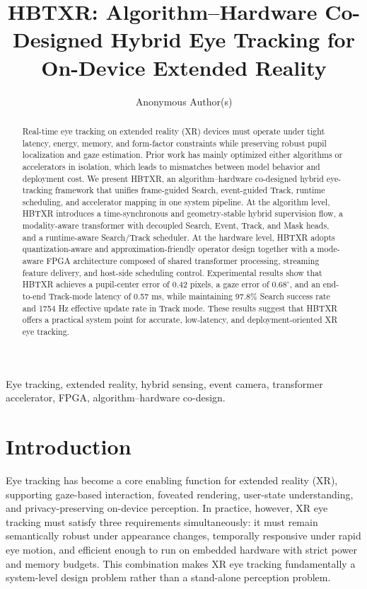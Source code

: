 \documentclass[journal]{IEEEtran}
\title{HBTXR: Algorithm--Hardware Co-Designed Hybrid Eye Tracking for On-Device Extended Reality}
\author{Anonymous Author(s)}
\begin{document}
\maketitle

\begin{abstract}
Real-time eye tracking on extended reality (XR) devices must operate under tight latency, energy, memory, and form-factor constraints while preserving robust pupil localization and gaze estimation. Prior work has mainly optimized either algorithms or accelerators in isolation, which leads to mismatches between model behavior and deployment cost. We present HBTXR, an algorithm--hardware co-designed hybrid eye-tracking framework that unifies frame-guided Search, event-guided Track, runtime scheduling, and accelerator mapping in one system pipeline. At the algorithm level, HBTXR introduces a time-synchronous and geometry-stable hybrid supervision flow, a modality-aware transformer with decoupled Search, Event, Track, and Mask heads, and a runtime-aware Search/Track scheduler. At the hardware level, HBTXR adopts quantization-aware and approximation-friendly operator design together with a mode-aware FPGA architecture composed of shared transformer processing, streaming feature delivery, and host-side scheduling control. Experimental results show that HBTXR achieves a pupil-center error of 0.42 pixels, a gaze error of $0.68^{\circ}$, and an end-to-end Track-mode latency of 0.57 ms, while maintaining 97.8\% Search success rate and 1754 Hz effective update rate in Track mode. These results suggest that HBTXR offers a practical system point for accurate, low-latency, and deployment-oriented XR eye tracking.
\end{abstract}

\begin{IEEEkeywords}
Eye tracking, extended reality, hybrid sensing, event camera, transformer accelerator, FPGA, algorithm--hardware co-design.
\end{IEEEkeywords}

\section{Introduction}
Eye tracking has become a core enabling function for extended reality (XR), supporting gaze-based interaction, foveated rendering, user-state understanding, and privacy-preserving on-device perception. In practice, however, XR eye tracking must satisfy three requirements simultaneously: it must remain semantically robust under appearance changes, temporally responsive under rapid eye motion, and efficient enough to run on embedded hardware with strict power and memory budgets. This combination makes XR eye tracking fundamentally a system-level design problem rather than a stand-alone perception problem.
\end{document}
